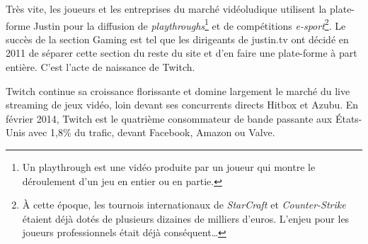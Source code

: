\documentclass[a4paper]{article}
\begin{document}
Très vite, les joueurs et les entreprises du marché vidéoludique utilisent la plate-forme Justin pour la diffusion de \textit{playthroughs}\footnote{Un playthrough est une vidéo produite par un joueur qui montre le déroulement d'un jeu en entier ou en partie.} et de compétitions \textit{e-sport}\footnote{À cette époque, les tournois internationaux de \textit{StarCraft} et \textit{Counter-Strike} étaient déjà dotés de plusieurs dizaines de milliers d'euros. L'enjeu pour les joueurs professionnels était déjà conséquent\ldots}. Le succès de la section Gaming est tel que les dirigeants de justin.tv ont décidé en 2011 de séparer cette section du reste du site et d'en faire une plate-forme à part entière. C'est l'acte de naissance de Twitch\cite{BW2011}.

Twitch continue sa croissance florissante et domine largement le marché du live streaming de jeux vidéo, loin devant ses concurrents directs Hitbox et Azubu. En février 2014, Twitch est le quatrième consommateur de bande passante aux États-Unis avec 1,8\% du trafic, devant Facebook, Amazon ou Valve\cite{Polygon2014}. 
\end{document}
